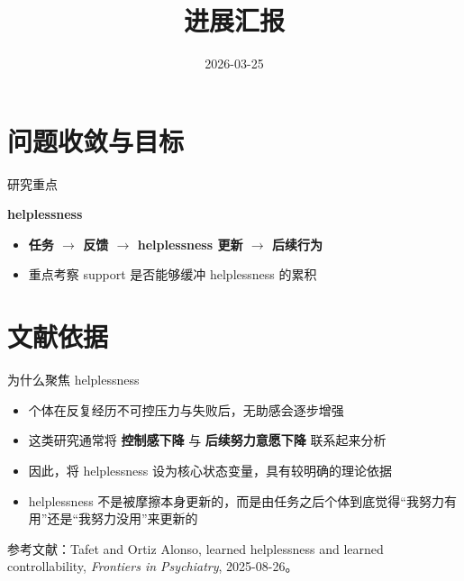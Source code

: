 \documentclass[aspectratio=169]{beamer}
\title[report]{进展汇报}
\date{2026-03-25}
\newcommand{\framebottomnote}[1]{%
    \vfill
    \par\noindent
    {\tiny\color{black!65}\parbox{0.96\linewidth}{#1}\par}%
    \vspace*{-0.75cm}%
}
\begin{document}
\begin{frame}
    \titlepage
\end{frame}

\section{问题收敛与目标}

\begin{frame}{研究重点}
    \begin{center}
        \Large \textbf{helplessness}
    \end{center}
    \vspace{0.15cm}
    \begin{itemize}
        \item \textbf{任务 $\rightarrow$ 反馈 $\rightarrow$ helplessness 更新 $\rightarrow$ 后续行为}
        \item 重点考察 support 是否能够缓冲 helplessness 的累积
    \end{itemize}
\end{frame}

\section{文献依据}

\begin{frame}{为什么聚焦 helplessness}
    \begin{itemize}
        \item 个体在反复经历不可控压力与失败后，无助感会逐步增强
        \item 这类研究通常将 \textbf{控制感下降} 与 \textbf{后续努力意愿下降} 联系起来分析
        \item 因此，将 helplessness 设为核心状态变量，具有较明确的理论依据
        \item helplessness 不是被摩擦本身更新的，而是由任务之后个体到底觉得“我努力有用”还是“我努力没用”来更新的
    \end{itemize}
    \framebottomnote{参考文献：Tafet and Ortiz Alonso, learned helplessness and learned controllability, \textit{Frontiers in Psychiatry}, 2025-08-26。}
\end{frame}
\end{document}
